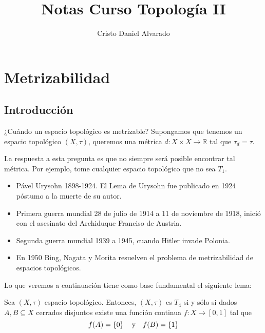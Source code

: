 \documentclass[12pt]{report}
\newcounter{it}
\theoremstyle{largebreak}
\newcommand\cf[3]{\ensuremath{#1:#2\rightarrow#3}}
\begin{document}
    \setlength{\parskip}{5pt} %
    \setlength{\parindent}{12pt} %
    \title{Notas Curso Topología II}
    \author{Cristo Daniel Alvarado}
    \maketitle

    \tableofcontents %

    
    \chapter{Metrizabilidad}
    
    \section{Introducción}
    
    ¿Cuándo un espacio topológico es metrizable? Supongamos que tenemos un espacio topológico $(X,\tau)$, queremos una métrica $\cf{d}{X\times X}{\mathbb{R}}$ tal que $\tau_d=\tau$.

    La respuesta a esta pregunta es que no siempre será posible encontrar tal métrica. Por ejemplo, tome cualquier espacio topológico que no sea $T_1$.

    \begin{itemize}
        \item Pável Urysohn 1898-1924. El Lema de Urysohn fue publicado en 1924 póstumo a la muerte de su autor.
        \item Primera guerra mundial 28 de julio de 1914 a 11 de noviembre de 1918, inició con el asesinato del Archiduque Franciso de Austria.
        \item Segunda guerra mundial 1939 a 1945, cuando Hitler invade Polonia.
        \item En 1950 Bing, Nagata y Morita resuelven el problema de metrizabilidad de espacios topológicos.
    \end{itemize}

    Lo que veremos a continuación tiene como base fundamental el siguiente lema:

    \begin{lema}
        Sea $(X,\tau)$ espacio topológico. Entonces, $(X,\tau)$ es $T_4$ si y sólo si dados $A,B\subseteq X$ cerrados disjuntos existe una función continua $\cf{f}{X}{[0,1]}$ tal que
        \begin{equation*}
            f(A)=\left\{0\right\} \quad\textup{y}\quad f(B)=\left\{1\right\}
        \end{equation*}
    \end{lema}
\end{document}
